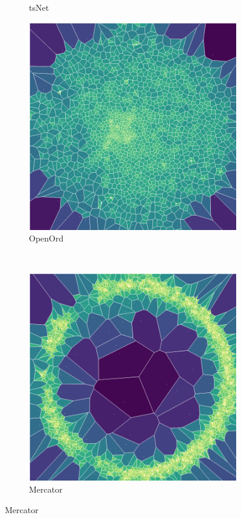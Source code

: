 \begin{figure}[H]
\begin{subfigure}[b]{.45\textwidth}
         \caption{tsNet}
         \label{fig:ats}
     \end{subfigure}
    \begin{subfigure}[b]{.45\textwidth}
         \centering \includegraphics[width=\textwidth,angle=-180]{figures_c1/area/fill_oo_aphh.png}
         \caption{OpenOrd}
         \label{fig:aoo}
     \end{subfigure}\\
     \begin{subfigure}[b]{.45\textwidth}
         \centering \includegraphics[width=\textwidth,angle=0]{figures_c1/area/fill_mercloc.png}
         \caption{Mercator}
         \label{fig:amer}
     \end{subfigure}


\end{figure}
